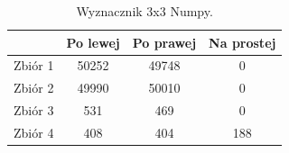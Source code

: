 \documentclass[11pt]{scrartcl}
\begin{document}
    \begin{table}[H]
        \centering
        \renewcommand{\arraystretch}{1.5}
        \begin{tabular}{| c | c | c | c |}
            \hline
            & Po lewej & Po prawej & Na prostej \\
            \hline
            Zbiór 1 & 50252 & 49748 & 0 \\
            \hline
            Zbiór 2 & 49990 & 50010 & 0 \\
            \hline
            Zbiór 3 & 531 & 469 & 0 \\
            \hline
            Zbiór 4 & 408 & 404 & 188 \\
            \hline
        \end{tabular}
        \renewcommand{\arraystretch}{1.5}
        \caption{Wyznacznik 3x3 Numpy.}
    \end{table}
    
\end{document}
